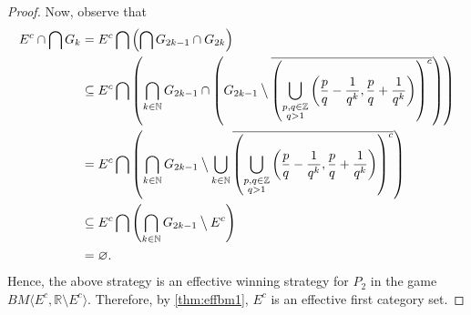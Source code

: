 \documentclass[10pt,a4paper]{amsart}
\newcommand{\N}{\mathbb{N}}
\begin{document}
\begin{proof}
Now, observe that
\begin{align*}
  E^c\cap\bigcap G_k&=E^c\bigcap\left(\bigcap G_{2k-1}\cap G_{2k}\right)\\
                    &\subseteq E^c\bigcap\left(\bigcap_{k\in\N}G_{2k-1}\cap\left(G_{2k-1}\mathbin{\big\backslash}\overline{\left(\bigcup_{\substack{p,q\in\mathbb{Z}\\q>1}}\left(\frac{p}{q}-\frac{1}{q^k},\frac{p}{q}+\frac{1}{q^k}\right)\right)^c}\right)\right)\\
                    &=E^c\bigcap\left(\bigcap_{k\in\N}G_{2k-1}\mathbin{\big\backslash}\bigcup_{k\in\N}\overline{\left(\bigcup_{\substack{p,q\in\mathbb{Z}\\q>1}}\left(\frac{p}{q}-\frac{1}{q^k},\frac{p}{q}+\frac{1}{q^k}\right)\right)^c}\right)\\
                    &\subseteq E^c\bigcap\left(\bigcap_{k\in\N}G_{2k-1}\mathbin{\big\backslash}E^c\right)\\
                    &=\varnothing.
\end{align*}
Hence, the above strategy is an effective winning strategy for $P_2$
in the game $BM\langle E^c,\mathbb{R}\setminus E^c\rangle$. Therefore,
by \cref{thm:effbm1}, $E^c$ is an effective first category set.
\end{proof}
\end{document}
